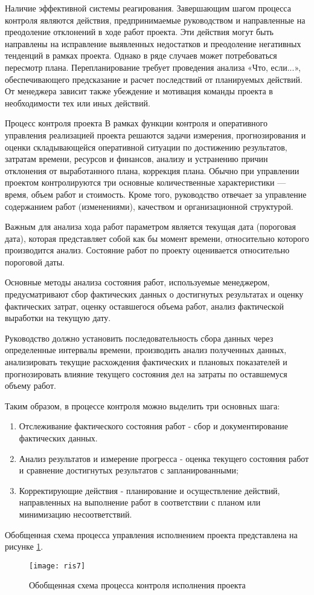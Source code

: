 Наличие эффективной системы реагирования.
Завершающим шагом процесса контроля являются действия, предпринимаемые руководством и направленные на преодоление отклонений в ходе работ проекта.
Эти действия могут быть направлены на исправление выявленных недостатков и преодоление негативных тенденций в рамках проекта.
Однако в ряде случаев может потребоваться пересмотр плана.
Перепланирование требует проведения анализа «Что, если...», обеспечивающего предсказание и расчет последствий от планируемых действий.
От менеджера зависит также убеждение и мотивация команды проекта в необходимости тех или иных действий.

Процесс контроля проекта
В рамках функции контроля и оперативного управления реализацией проекта решаются задачи измерения, прогнозирования и оценки складывающейся оперативной ситуации по достижению результатов, затратам времени, ресурсов и финансов, анализу и устранению причин отклонения от выработанного плана, коррекция плана.
Обычно при управлении проектом контролируются три основные количественные характеристики --- время, объем работ и стоимость.
Кроме того, руководство отвечает за управление содержанием работ (изменениями), качеством и организационной структурой.

Важным для анализа хода работ параметром является текущая дата (пороговая дата), которая представляет собой как бы момент времени, относительно которого производится анализ.
Состояние работ по проекту оценивается относительно пороговой даты.

Основные методы анализа состояния работ, используемые менеджером, предусматривают сбор фактических данных о достигнутых результатах и оценку фактических затрат, оценку оставшегося объема работ, анализ фактической выработки на текущую дату.

Руководство должно установить последовательность сбора данных через определенные интервалы времени, производить анализ полученных данных, анализировать текущие расхождения фактических и плановых показателей и прогнозировать влияние текущего состояния дел на затраты по оставшемуся объему работ.

Таким образом, в процессе контроля можно выделить три основных шага:

\begin{enumerate}
	\item Отслеживание фактического состояния работ - сбор и документирование фактических данных.
	\item Анализ результатов и измерение прогресса - оценка текущего состояния работ и сравнение достигнутых результатов с запланированными;
	\item Корректирующие действия - планирование и осуществление действий, направленных на выполнение работ в соответствии с планом или минимизацию несоответствий.
\end{enumerate}

Обобщенная схема процесса управления исполнением проекта представлена на рисунке \ref{fig:ris7}.
\begin{figure}[!h]
	\centering
	\texttt{[image: ris7]}
	\caption{Обобщенная схема процесса контроля исполнения проекта}
	\label{fig:ris7}
\end{figure}
